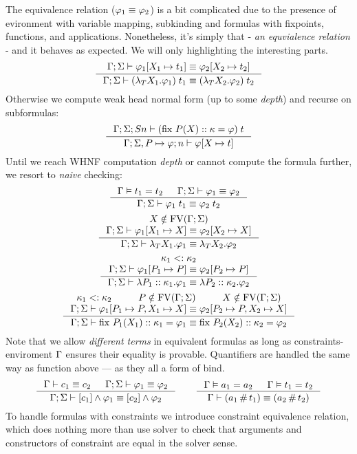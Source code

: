 \documentclass[english, mgr]{iithesis}
\begin{document}
The equivalence relation ($\varphi_1 \equiv \varphi_2$) is a bit complicated
due to the presence of evironment with variable mapping, subkinding and formulas
with fixpoints, functions, and applications.
Nonetheless, it's simply that - \textit{an equvialence relation} - and it
behaves as expected. We will only highlighting the interesting parts.
$$
  \inference{
    \jgmnt[\Gamma; \Sigma]{\formphi_1[\termv_1 \mapsto  \term_1] \equiv \formphi_2[\termv_2 \mapsto \term_2] }
    }{
    \jgmnt[\Gamma; \Sigma]{(\fLamTerm{\termv_1}\formphi_1) \fAppTerm \term_1 \equiv (\fLamTerm{\termv_2}\formphi_2) \fAppTerm \term_2}
  }
$$
Otherwise we compute weak head normal form (up to some \textit{depth}) and recurse on subformulas:
$$
  \inference{
    \jgmnt[\Gamma; \Sigma; S n]{(\fix{P}{\termv}{\kind}\formphi) \fAppTerm \term}
    }{
    \jgmnt[\Gamma; \Sigma, P \mapsto \formphi; n]{\formphi[\termv \mapsto \term]}
  }
$$
Until we reach WHNF computation \textit{depth} or cannot compute the formula further,
we resort to \textit{naive} checking:
$$
  \inference{
    \cjgmnt[\Gamma]{\term_1 \ceq \term_2} &
    \jgmnt[\Gamma; \Sigma]{\formphi_1 \equiv \formphi_2 }
    }{
    \jgmnt[\Gamma; \Sigma]{\formphi_1 \fAppTerm \term_1 \equiv \formphi_2 \fAppTerm \term_2 }
  }
$$
$$
  \inference{
    \termv \notin \fv[\Gamma; \Sigma] \\
    \jgmnt[\Gamma; \Sigma]{\formphi_1[\termv_1 \mapsto \termv] \equiv \formphi_2[\termv_2 \mapsto \termv] }
    }{
    \jgmnt[\Gamma; \Sigma]{\fLamTerm{\termv_1}\formphi_1 \equiv \fLamTerm{\termv_2}\formphi_2 }
  }
$$
$$
  \inference{
    \kind_1 \subkind \kind_2 \\
    \jgmnt[\Gamma; \Sigma]{\formphi_1[P_1 \mapsto P] \equiv \formphi_2[P_2 \mapsto P] }
    }{
    \jgmnt[\Gamma; \Sigma]{\fLamForm{P_1}{\kind_1}{\formphi_1} \equiv \fLamForm{P_2}{\kind_2}{\formphi_2}}
  }
$$
$$
  \inference{
    \kind_1 \subkind \kind_2 &
    P \notin \fv[\Gamma; \Sigma] & \termv \notin \fv[\Gamma; \Sigma] \\
    \jgmnt[\Gamma; \Sigma]{\formphi_1[P_1 \mapsto P, \termv_1 \mapsto \termv] \equiv \formphi_2[P_2 \mapsto P, \termv_2 \mapsto \termv] }
    }{
    \jgmnt[\Gamma; \Sigma]{\fix{P_1}{\termv_1}{\kind_1}\formphi_1 \equiv \fix{P_2}{\termv_2}{\kind_2}\formphi_2}
  }
$$
Note that we allow \textit{different terms} in equivalent formulas as long as
constraints-enviroment $\Gamma$ ensures their equality is provable.
Quantifiers are handled the same way as function above --- as they all a form of bind.
\begin{eqnarray*}
  \inference{
    \jgmnt[\Gamma]{\constr_1 \equiv \constr_2 } &
    \jgmnt[\Gamma; \Sigma]{\formphi_1 \equiv \formphi_2 }
  }{
    \jgmnt[\Gamma; \Sigma]{\fCAnd{\constr_1}\formphi_1 \equiv \fCAnd{\constr_2}\formphi_2 }
  }
\qquad
  \inference{
    \cjgmnt[\Gamma]{\atomv_1 \ceq \atomv_2 } & \cjgmnt[\Gamma]{\term_1 \ceq \term_2 }
  }{
    \jgmnt[\Gamma]{(\atomv_1 \cfresh \term_1) \equiv (\atomv_2 \cfresh \term_2) }
  }
\end{eqnarray*}
To handle formulas with constraints we introduce constraint equivalence relation,
which does nothing more than use solver to check that arguments and constructors
of constraint are equal in the solver sense.
\end{document}
